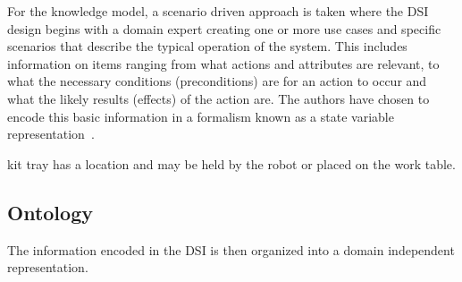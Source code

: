 For the knowledge model, a scenario driven approach is taken where the DSI design begins with a domain expert creating one or more use cases and specific scenarios that describe the typical operation of the system. This includes information on items ranging from what actions and attributes are relevant, to what the necessary conditions (preconditions) are for an action to occur and what the likely results (effects) of the action are. The authors have chosen to encode this basic information in a formalism known as a state variable representation~\cite{NAU.2004}.


kit tray has a location and may be held by the robot or placed on the work table.

\subsection{Ontology}
\label{subsection:ontology}
The information encoded in the DSI is then organized into a domain
independent representation. 

